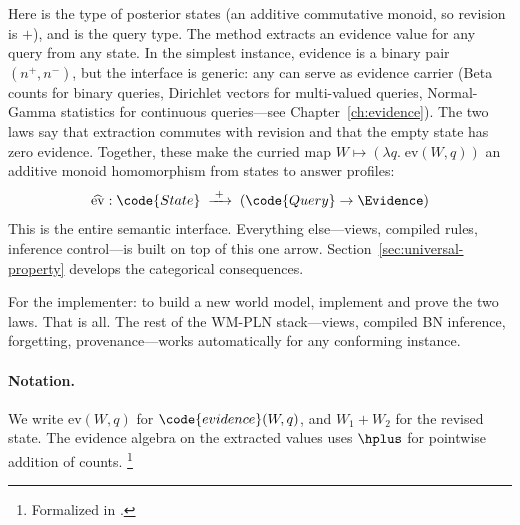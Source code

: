 \documentclass[11pt,openany]{report}
\begin{document}
Here  is the type of posterior states (an additive
commutative monoid, so revision is $+$), and  is the
query type.  The method  extracts an evidence value
for any query from any state.  In the simplest instance, evidence is a
binary pair $(n^+, n^-)$, but the interface is generic: any
 can serve as evidence carrier (Beta counts for
binary queries, Dirichlet vectors for multi-valued queries, Normal-Gamma
statistics for continuous queries---see Chapter~\ref{ch:evidence}).
The two laws say that extraction commutes with revision and that the
empty state has zero evidence.  Together, these make the curried map
$W \mapsto (\lambda q.\; \mathrm{ev}(W, q))$ an additive monoid
homomorphism from states to answer profiles:
\[
  \widehat{\mathrm{ev}} : \code{State} \;\xrightarrow{\;+\;}\;
  (\code{Query} \to \Evidence)
\]
This is the entire semantic interface.  Everything else---views,
compiled rules, inference control---is built on top of this one arrow.
Section~\ref{sec:universal-property} develops the categorical
consequences.

For the implementer: to build a new world model, implement 
and prove the two laws.  That is all.  The rest of the WM-PLN stack---views,
compiled BN inference, forgetting, provenance---works automatically for any
conforming instance.

\paragraph{Notation.}
We write $\mathrm{ev}(W, q)$ for $\code{evidence}(W, q)$, and $W_1 + W_2$
for the revised state.  The evidence algebra on the extracted values uses
$\hplus$ for pointwise addition of counts.%
\footnote{Formalized in .}
\end{document}
